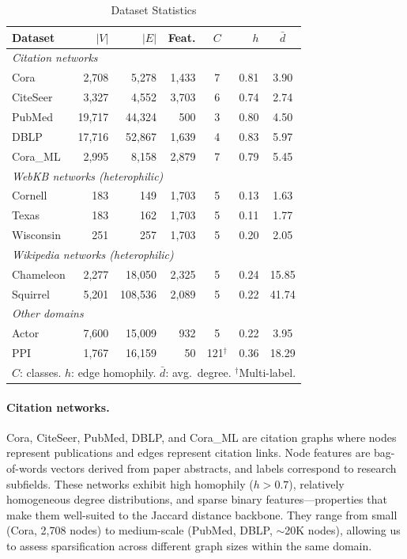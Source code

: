 \documentclass[conference]{IEEEtran}
\begin{document}
\begin{table}[t!]
\caption{Dataset Statistics}
\begin{center}
\small
\begin{tabular}{lrrrcrc}
\toprule
\textbf{Dataset} & $|V|$ & $|E|$ & \textbf{Feat.} & $C$ & $h$ & $\bar{d}$ \\
\midrule
\multicolumn{7}{l}{\textit{Citation networks}} \\
Cora & 2{,}708 & 5{,}278 & 1{,}433 & 7 & 0.81 & 3.90 \\
CiteSeer & 3{,}327 & 4{,}552 & 3{,}703 & 6 & 0.74 & 2.74 \\
PubMed & 19{,}717 & 44{,}324 & 500 & 3 & 0.80 & 4.50 \\
DBLP & 17{,}716 & 52{,}867 & 1{,}639 & 4 & 0.83 & 5.97 \\
Cora\_ML & 2{,}995 & 8{,}158 & 2{,}879 & 7 & 0.79 & 5.45 \\
\midrule
\multicolumn{7}{l}{\textit{WebKB networks (heterophilic)}} \\
Cornell & 183 & 149 & 1{,}703 & 5 & 0.13 & 1.63 \\
Texas & 183 & 162 & 1{,}703 & 5 & 0.11 & 1.77 \\
Wisconsin & 251 & 257 & 1{,}703 & 5 & 0.20 & 2.05 \\
\midrule
\multicolumn{7}{l}{\textit{Wikipedia networks (heterophilic)}} \\
Chameleon & 2{,}277 & 18{,}050 & 2{,}325 & 5 & 0.24 & 15.85 \\
Squirrel & 5{,}201 & 108{,}536 & 2{,}089 & 5 & 0.22 & 41.74 \\
\midrule
\multicolumn{7}{l}{\textit{Other domains}} \\
Actor & 7{,}600 & 15{,}009 & 932 & 5 & 0.22 & 3.95 \\
PPI & 1{,}767 & 16{,}159 & 50 & 121$^\dagger$ & 0.36 & 18.29 \\
\bottomrule
\multicolumn{7}{l}{\footnotesize $C$: classes. $h$: edge homophily. $\bar{d}$: avg.\ degree. $^\dagger$Multi-label.}
\end{tabular}
\label{tab:datasets}
\end{center}
\end{table}

\paragraph{Citation networks.} Cora, CiteSeer, PubMed, DBLP, and Cora\_ML are citation graphs where nodes represent publications and edges represent citation links. Node features are bag-of-words vectors derived from paper abstracts, and labels correspond to research subfields. These networks exhibit high homophily ($h > 0.7$), relatively homogeneous degree distributions, and sparse binary features---properties that make them well-suited to the Jaccard distance backbone. They range from small (Cora, 2{,}708 nodes) to medium-scale (PubMed, DBLP, ${\sim}$20K nodes), allowing us to assess sparsification across different graph sizes within the same domain.
\end{document}
